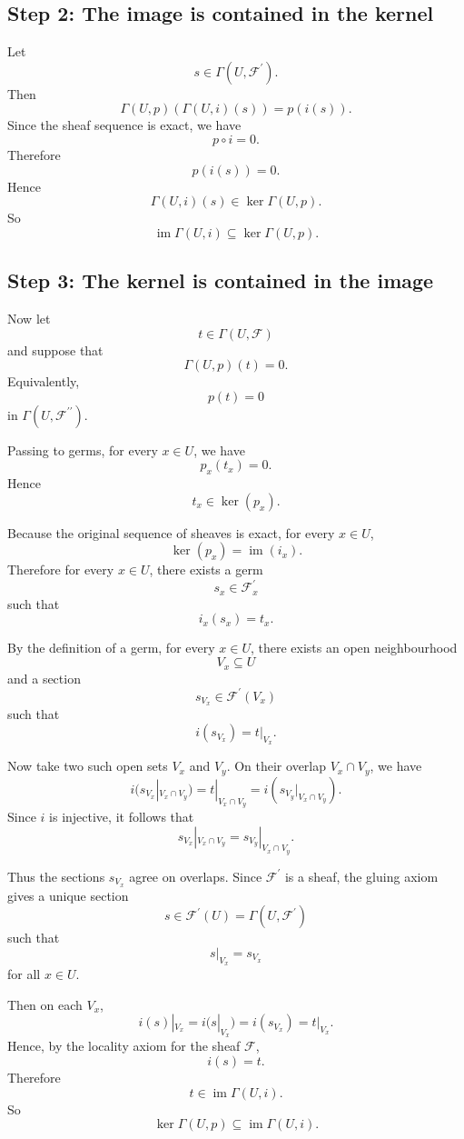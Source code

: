 \subsection{Step 2: The image is contained in the kernel}

Let
\[
s\in \Gamma(U,\mathcal{F}^{\prime}).
\]
Then
\[
\Gamma(U,p)(\Gamma(U,i)(s))
=
p(i(s)).
\]
Since the sheaf sequence is exact, we have
\[
p\circ i=0.
\]
Therefore
\[
p(i(s))=0.
\]
Hence
\[
\Gamma(U,i)(s)\in \ker \Gamma(U,p).
\]
So
\[
\operatorname{im} \Gamma(U,i)\subseteq \ker \Gamma(U,p).
\]

\subsection{Step 3: The kernel is contained in the image}

Now let
\[
t\in \Gamma(U,\mathcal{F})
\]
and suppose that
\[
\Gamma(U,p)(t)=0.
\]
Equivalently,
\[
p(t)=0
\]
in \(\Gamma(U,\mathcal{F}^{\prime\prime})\).

Passing to germs, for every \(x\in U\), we have
\[
p_x(t_x)=0.
\]
Hence
\[
t_x\in \ker(p_x).
\]

Because the original sequence of sheaves is exact, for every \(x\in U\),
\[
\ker(p_x)=\operatorname{im}(i_x).
\]
Therefore for every \(x\in U\), there exists a germ
\[
s_x\in \mathcal{F}^{\prime}_x
\]
such that
\[
i_x(s_x)=t_x.
\]

By the definition of a germ, for every \(x\in U\), there exists an open neighbourhood
\[
V_x\subseteq U
\]
and a section
\[
s_{V_x}\in \mathcal{F}^{\prime}(V_x)
\]
such that
\[
i(s_{V_x})=t|_{V_x}.
\]

Now take two such open sets \(V_x\) and \(V_y\). On their overlap \(V_x\cap V_y\), we have
\[
i(s_{V_x}|_{V_x\cap V_y})
=
t|_{V_x\cap V_y}
=
i(s_{V_y}|_{V_x\cap V_y}).
\]
Since \(i\) is injective, it follows that
\[
s_{V_x}|_{V_x\cap V_y}
=
s_{V_y}|_{V_x\cap V_y}.
\]

Thus the sections \(s_{V_x}\) agree on overlaps. Since \(\mathcal{F}^{\prime}\) is a sheaf, the gluing axiom gives a unique section
\[
s\in \mathcal{F}^{\prime}(U)=\Gamma(U,\mathcal{F}^{\prime})
\]
such that
\[
s|_{V_x}=s_{V_x}
\]
for all \(x\in U\).

Then on each \(V_x\),
\[
i(s)|_{V_x}
=
i(s|_{V_x})
=
i(s_{V_x})
=
t|_{V_x}.
\]
Hence, by the locality axiom for the sheaf \(\mathcal{F}\),
\[
i(s)=t.
\]
Therefore
\[
t\in \operatorname{im} \Gamma(U,i).
\]
So
\[
\ker \Gamma(U,p)\subseteq \operatorname{im} \Gamma(U,i).
\]

